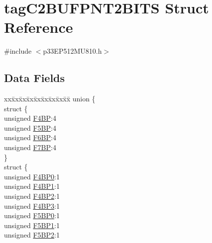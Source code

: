 \hypertarget{structtag_c2_b_u_f_p_n_t2_b_i_t_s}{}\section{tag\+C2\+B\+U\+F\+P\+N\+T2\+B\+I\+TS Struct Reference}
\label{structtag_c2_b_u_f_p_n_t2_b_i_t_s}


{\ttfamily \#include $<$p33\+E\+P512\+M\+U810.\+h$>$}

\subsection*{Data Fields}
\begin{DoxyCompactItemize}
\item 
\begin{tabbing}
xx\=xx\=xx\=xx\=xx\=xx\=xx\=xx\=xx\=\kill
union \{\\
\>struct \{\\
\>\>unsigned \hyperlink{structtag_c2_b_u_f_p_n_t2_b_i_t_s_a967992f3cc98d44367e080c4614b853f}{F4BP}:4\\
\>\>unsigned \hyperlink{structtag_c2_b_u_f_p_n_t2_b_i_t_s_ae2c878f927b220b50e83dae47a2240d5}{F5BP}:4\\
\>\>unsigned \hyperlink{structtag_c2_b_u_f_p_n_t2_b_i_t_s_a559a0c514d1efecd5bab3cf05c2f5999}{F6BP}:4\\
\>\>unsigned \hyperlink{structtag_c2_b_u_f_p_n_t2_b_i_t_s_a5f540f74101c21ce8be00f951eb7790b}{F7BP}:4\\
\>\} \\
\>struct \{\\
\>\>unsigned \hyperlink{structtag_c2_b_u_f_p_n_t2_b_i_t_s_ab96598b0d7fdfcf6278a850fc99796e8}{F4BP0}:1\\
\>\>unsigned \hyperlink{structtag_c2_b_u_f_p_n_t2_b_i_t_s_a75d84446c5fb6c126812f3adacd54847}{F4BP1}:1\\
\>\>unsigned \hyperlink{structtag_c2_b_u_f_p_n_t2_b_i_t_s_a2ca4c7010c5bd06bdc3c5829aa464284}{F4BP2}:1\\
\>\>unsigned \hyperlink{structtag_c2_b_u_f_p_n_t2_b_i_t_s_a83cb42cb8a89b2568afe99b8cc15a05f}{F4BP3}:1\\
\>\>unsigned \hyperlink{structtag_c2_b_u_f_p_n_t2_b_i_t_s_ac5aa8ee1d6b2a7b47831f1fee5b1bd09}{F5BP0}:1\\
\>\>unsigned \hyperlink{structtag_c2_b_u_f_p_n_t2_b_i_t_s_a23ca2a843318258593df11ca2fc7361f}{F5BP1}:1\\
\>\>unsigned \hyperlink{structtag_c2_b_u_f_p_n_t2_b_i_t_s_a49011c2c741be4d608ee20d2667241dd}{F5BP2}:1\\

\end{tabbing}
\end{DoxyCompactItemize}
